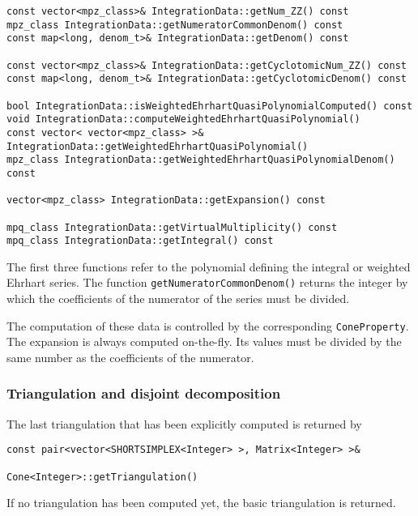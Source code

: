 \documentclass[12pt,a4paper]{scrartcl}
\theoremstyle{definition}
\begin{document}
\begin{small}
\begin{Verbatim}
const vector<mpz_class>& IntegrationData::getNum_ZZ() const
mpz_class IntegrationData::getNumeratorCommonDenom() const
const map<long, denom_t>& IntegrationData::getDenom() const

const vector<mpz_class>& IntegrationData::getCyclotomicNum_ZZ() const
const map<long, denom_t>& IntegrationData::getCyclotomicDenom() const

bool IntegrationData::isWeightedEhrhartQuasiPolynomialComputed() const
void IntegrationData::computeWeightedEhrhartQuasiPolynomial()
const vector< vector<mpz_class> >& IntegrationData::getWeightedEhrhartQuasiPolynomial()
mpz_class IntegrationData::getWeightedEhrhartQuasiPolynomialDenom() const

vector<mpz_class> IntegrationData::getExpansion() const

mpq_class IntegrationData::getVirtualMultiplicity() const
mpq_class IntegrationData::getIntegral() const
\end{Verbatim}

The first three functions refer to the polynomial defining the integral or weighted Ehrhart series. The function \verb|getNumeratorCommonDenom()| returns the integer by which the coefficients of the numerator of the series must be divided.

The computation of these data is controlled by the corresponding \verb|ConeProperty|. The expansion is always computed on-the-fly. Its values must be divided by the same number as the coefficients of the numerator.

\subsubsection{Triangulation and disjoint decomposition}

The last triangulation that has been explicitly computed is returned by
\begin{Verbatim}
const pair<vector<SHORTSIMPLEX<Integer> >, Matrix<Integer> >&
                                                Cone<Integer>::getTriangulation()
\end{Verbatim}
If no triangulation has been computed yet, the basic triangulation is returned.


\end{small}
\end{document}
